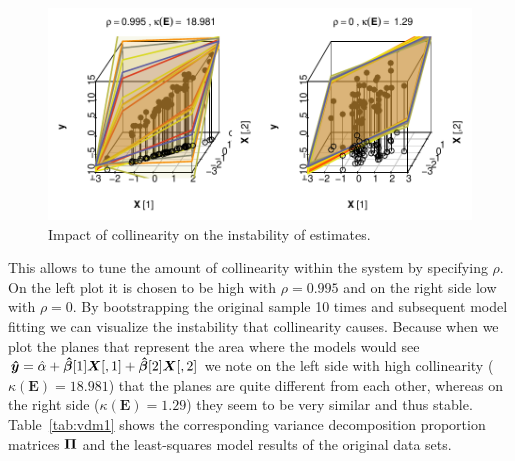 \documentclass[11pt,a4paper,twoside]{book}\usepackage[]{graphicx}\usepackage[]{xcolor}
\makeatletter
\def\maxwidth{ %
  \ifdim\Gin@nat@width>\linewidth
    \linewidth
  \else
    \Gin@nat@width
  \fi
}
\newenvironment{knitrout}{}{} %
\makeatother
\begin{document}
\begin{figure}[H]%
\centering
\begin{knitrout}
\color{fgcolor}
\includegraphics[width=\maxwidth]{figure/ch02_figcond-1} 
\end{knitrout}
\vspace{-7mm}
\caption{Impact of collinearity on the instability of estimates. }\label{fig:cond_ill}
\end{figure}
This allows to tune the amount of collinearity within the system by specifying $\rho$. On the left plot it is chosen to be high with $\rho=0.995$ and on the right side low with $\rho=0$. By bootstrapping the original sample 10 times and subsequent model fitting we can visualize the instability that collinearity causes. Because when we plot the planes that represent the area where the models would see ${\boldsymbol{\hat{y}}}=\hat{\alpha}+{\boldsymbol{\hat\beta}}[1]{\boldsymbol{X}}[,1]+{\boldsymbol{\hat\beta}}[2]{\boldsymbol{X}}[,2]$ we note on the left side with high collinearity ($\kappa\left(\boldsymbol{E}\right)=18.981$) that the planes are quite different from each other, whereas on the right side ($\kappa\left(\boldsymbol{E}\right)=1.29$) they seem to be very similar and thus stable. Table~\ref{tab:vdm1} shows the corresponding variance decomposition proportion matrices ${\boldsymbol{\Pi}}$ and the least-squares model results of the original data sets.
\end{document}
